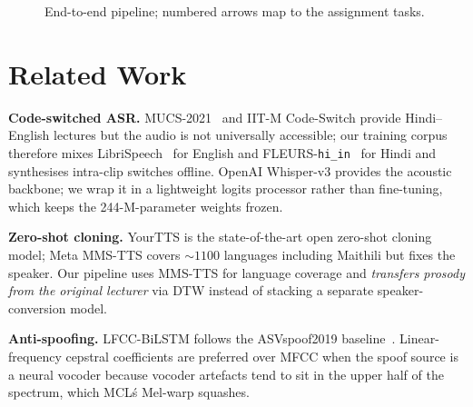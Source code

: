 \documentclass[conference]{IEEEtran}
\begin{document}
\begin{figure}[t]
\centering
{}
\caption{End-to-end pipeline; numbered arrows map to the assignment tasks.}
\end{figure}

\section{Related Work}
\textbf{Code-switched ASR.} MUCS-2021~\cite{diwan2021mucs} and
IIT-M Code-Switch provide Hindi--English lectures but the audio is
not universally accessible; our training corpus therefore mixes
LibriSpeech~\cite{panayotov2015librispeech} for English and
FLEURS-\texttt{hi\_in}~\cite{conneau2023fleurs} for Hindi and
synthesises intra-clip switches offline. OpenAI Whisper-v3
\cite{radford2023whisper} provides the acoustic backbone; we wrap it
in a lightweight logits processor rather than fine-tuning, which
keeps the 244-M-parameter weights frozen.

\textbf{Zero-shot cloning.} YourTTS \cite{casanova2022yourtts} is the
state-of-the-art open zero-shot cloning model; Meta MMS-TTS
\cite{pratap2023mms} covers $\sim 1100$ languages including
Maithili but fixes the speaker. Our pipeline uses MMS-TTS for
language coverage and \textit{transfers prosody from the original
lecturer} via DTW instead of stacking a separate speaker-conversion
model.

\textbf{Anti-spoofing.} LFCC-BiLSTM follows the ASVspoof2019
baseline~\cite{sahidullah2015lfcc}. Linear-frequency cepstral
coefficients are preferred over MFCC when the spoof source is a
neural vocoder because vocoder artefacts tend to sit in the upper
half of the spectrum, which MCL\'s Mel-warp squashes.
\end{document}
